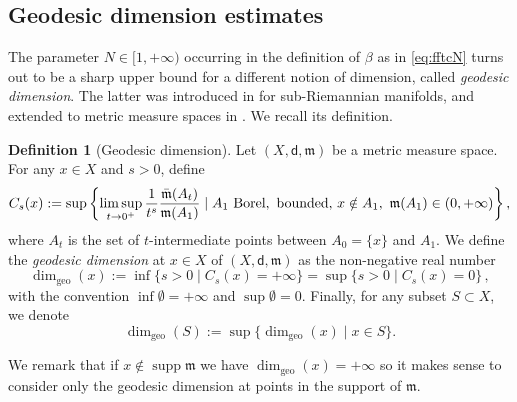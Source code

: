 \documentclass[11pt,a4paper]{article}
\theoremstyle{plain}
\theoremstyle{definition}
\newtheorem{definition}[theorem]{Definition}
\theoremstyle{remark}
\numberwithin{equation}{section}
\DeclareMathOperator{\supp}{\mathrm{supp}}
\newcommand{\mm}{\mathfrak m}
\newcommand{\sfd}{\mathsf d}
\newcommand{\NN}{\dim_{\mathrm{geo}}}
\begin{document}
\subsection{Geodesic dimension estimates}\label{Sec:Dim}

The parameter $N\in [1,+\infty)$ occurring in the definition of $\beta$ as in \eqref{eq:fftcN} turns out to be a sharp upper bound for a different notion of dimension, called \emph{geodesic dimension}. The latter was introduced in \cite{ABR-curvature} for sub-Riemannian manifolds, and extended to metric measure spaces in \cite{R-MCP}. We recall its definition.

\begin{definition}[Geodesic dimension]\label{def:geodim}
Let $(X,\sfd,\mm)$ be a metric measure space. For any $x\in X$ and $s>0$, define
\begin{equation}\label{eq:defCsx}
C_s(x):=\sup\left\{ \limsup_{t\to 0^+} \frac{1}{t^s} \frac{\bar{\mm}(A_t)}{\mm(A_1)} \mid \text{$A_1$ Borel,\, bounded, $x\notin A_{1}$,\,  $\mm(A_1)\in (0,+\infty)$} \right\},
\end{equation}
where $A_t$ is the set of $t$-intermediate points between $A_0 = \{x\}$ and $A_1$. We define the \emph{geodesic dimension} at $x\in X$ of $(X,\sfd,\mm)$ as the non-negative real number
\begin{equation}\label{eq:defNx}
\NN(x):=\inf \{s>0 \mid C_s(x) = +\infty \} = \sup\{s>0\mid C_s(x) =0 \}\, ,
\end{equation}
with the convention $\inf\emptyset = +\infty$ and $\sup\emptyset =0$. Finally, for any subset $S\subset X$, we denote
\begin{equation}
\NN(S):=\sup\{\NN(x)\mid x \in S\}.
\end{equation}
\end{definition}

We remark that if $x\notin \supp\mm$ we have $\NN(x) = +\infty$ so it makes sense to consider only the geodesic dimension at points in the support of $\mm$.
\end{document}
